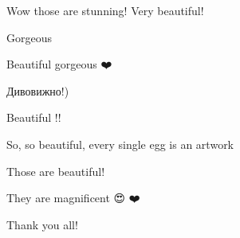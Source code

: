  
 
 
 
 

\qqSecCmt


Wow those are stunning! Very beautiful!


Gorgeous


Beautiful gorgeous ❤️


Дивовижно!)


Beautiful !! 💖


So, so beautiful, every single egg is an artwork 💙💛😍😍👏👏👏👏


Those are beautiful!


They are magnificent 😍 ❤️


Thank you all!💙💛
